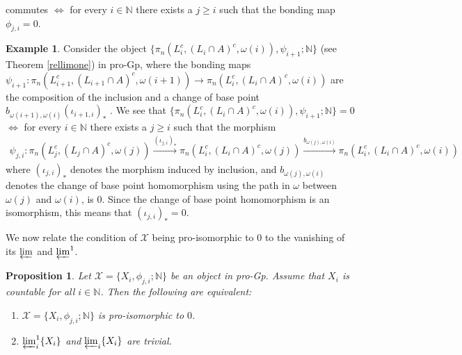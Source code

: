 \documentclass[a4paper,11pt]{article}
\theoremstyle{definition}
\newtheorem{example}[definition]{Example}
\theoremstyle{plain}
\newtheorem{prop}[definition]{Proposition}
\theoremstyle{remark}
\DeclareMathOperator{\id}{id}
\begin{document}
{\begin{figure}[H]
\center
{}
 \end{figure}
commutes $\iff$ for every $i\in \mathbb{N}$ there exists a $j\geq i$ such that the bonding map $\phi_{j,i}=0$. 

\begin{example} \label{relexample1} Consider the object $\{\pi_{n}(L_i^{c}, (L_{i}\cap A)^c, \omega(i)), \psi_{i+1}; \mathbb{N}\}$ (see Theorem \ref{rellimone}) in pro-Gp, where  the bonding maps $\psi_{i+1}: \pi_{n}(L_{i+1}^{c}, (L_{i+1}\cap A)^c, \omega(i+1))\rightarrow \pi_{n}(L_i^{c}, (L_{i}\cap A)^c, \omega(i))$ are the composition of the inclusion and a change of base point $b_{\omega(i+1),\omega(i)}(\iota_{i+1,i})_{\ast}$ . We see that $\{\pi_{n}(L_i^{c}, (L_{i}\cap A)^c, \omega(i)), \psi_{i+1}; \mathbb{N}\}=0$ $\iff$ for every $i\in \mathbb{N}$ there exists a $j\geq i$ such that the morphism
\begin{align*}
\psi_{j,i}:\pi_{n}(L_{j}^c, (L_j\cap A)^c, \omega(j))\xrightarrow{(\iota_{j,i})_{\ast}} \pi_{n}(L_{i}^c, (L_i\cap A)^c, \omega(j)) \xrightarrow{b_{\omega(j),\omega(i)}}  \pi_{n}(L_{i}^c, (L_i\cap A)^c, \omega(i))
\end{align*}
where $(\iota_{j,i})_{\ast}$ denotes the morphism induced by inclusion, and $b_{\omega(j),\omega(i)}$ denotes the change of base point homomorphism using the path in $\omega$ between $\omega(j)$ and $\omega(i)$, is $0$. Since the change of base point homomorphism is an isomorphism, this means that $(\iota_{j,i})_{\ast}=0$.  
\end{example}

We now relate the condition of $\mathcal{X}$ being pro-isomorphic to $0$ to the vanishing of its $\varprojlim$ and $\varprojlim^1$.

\begin{prop}\label{protrivial} Let $\mathcal{X}=\{X_{i},\phi_{j,i};\mathbb{N}\}$ be an object in pro-Gp. Assume that $X_{i}$ is countable for all $i\in \mathbb{N}$. Then the following are equivalent: 
\begin{enumerate}
\item $\mathcal{X}=\{X_{i},\phi_{j,i};\mathbb{N}\}$ is pro-isomorphic to $0$. 
\item $\varprojlim_{i}^1 \{X_{i}\}$ and $\varprojlim_{i} \{X_{i}\}$  are trivial. 
\end{enumerate}
\end{prop}

}
\end{document}
